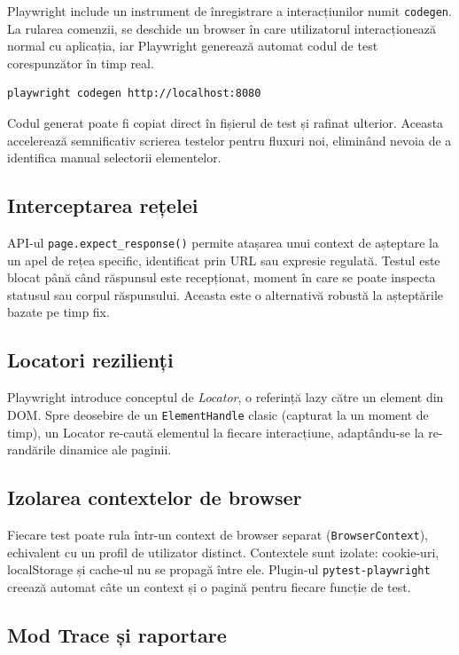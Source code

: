 Playwright include un instrument de înregistrare a interacțiunilor numit \texttt{codegen}.
La rularea comenzii, se deschide un browser în care utilizatorul interacționează normal
cu aplicația, iar Playwright generează automat codul de test corespunzător în timp real.

\begin{lstlisting}[language=bash]
playwright codegen http://localhost:8080
\end{lstlisting}

Codul generat poate fi copiat direct în fișierul de test și rafinat ulterior. Aceasta
accelerează semnificativ scrierea testelor pentru fluxuri noi, eliminând nevoia de a
identifica manual selectorii elementelor.

\subsection{Interceptarea rețelei}

API-ul \texttt{page.expect\_response()} permite atașarea unui context de așteptare la un
apel de rețea specific, identificat prin URL sau expresie regulată. Testul este blocat până
când răspunsul este recepționat, moment în care se poate inspecta statusul sau corpul
răspunsului. Aceasta este o alternativă robustă la așteptările bazate pe timp fix.

\subsection{Locatori rezilienți}

Playwright introduce conceptul de \textit{Locator}, o referință lazy către un element din DOM.
Spre deosebire de un \texttt{ElementHandle} clasic (capturat la un moment de timp), un Locator
re-caută elementul la fiecare interacțiune, adaptându-se la re-randările dinamice ale paginii.

\subsection{Izolarea contextelor de browser}

Fiecare test poate rula într-un context de browser separat (\texttt{BrowserContext}), echivalent
cu un profil de utilizator distinct. Contextele sunt izolate: cookie-uri, localStorage și cache-ul
nu se propagă între ele. Plugin-ul \texttt{pytest-playwright} creează automat câte un context și
o pagină pentru fiecare funcție de test.

\subsection{Mod Trace și raportare}

